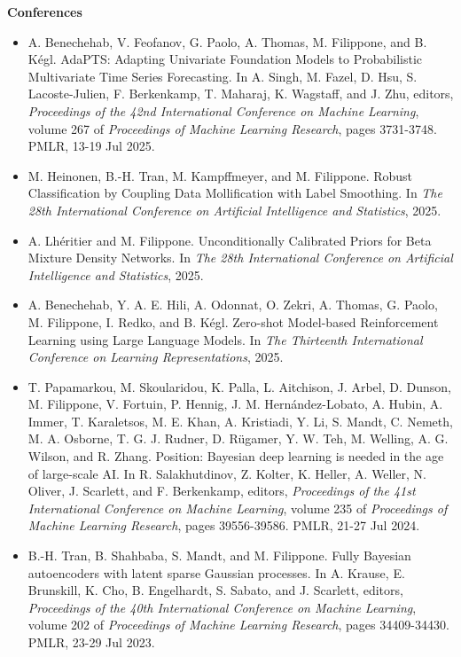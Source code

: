 \begin{itemize}
\end{itemize}\textbf{Conferences}\begin{itemize}\item  A. Benechehab, V. Feofanov, G. Paolo, A. Thomas, M. Filippone, and B. K\'egl. AdaPTS: Adapting Univariate Foundation Models to Probabilistic Multivariate Time Series Forecasting. In A. Singh, M. Fazel, D. Hsu, S. Lacoste-Julien, F. Berkenkamp, T. Maharaj, K. Wagstaff, and J. Zhu, editors, \emph{Proceedings of the 42nd International Conference on Machine Learning}, volume 267 of \emph{Proceedings of Machine Learning Research}, pages 3731-3748. PMLR, 13-19 Jul 2025.  
\item  M. Heinonen, B.-H. Tran, M. Kampffmeyer, and M. Filippone. Robust Classification by Coupling Data Mollification with Label Smoothing. In \emph{The 28th International Conference on Artificial Intelligence and Statistics}, 2025.  
\item  A. Lh\'eritier and M. Filippone. Unconditionally Calibrated Priors for Beta Mixture Density Networks. In \emph{The 28th International Conference on Artificial Intelligence and Statistics}, 2025.  
\item  A. Benechehab, Y. A. E. Hili, A. Odonnat, O. Zekri, A. Thomas, G. Paolo, M. Filippone, I. Redko, and B. K\'egl. Zero-shot Model-based Reinforcement Learning using Large Language Models. In \emph{The Thirteenth International Conference on Learning Representations}, 2025.  
\item  T. Papamarkou, M. Skoularidou, K. Palla, L. Aitchison, J. Arbel, D. Dunson, M. Filippone, V. Fortuin, P. Hennig, J. M. Hern\'andez-Lobato, A. Hubin, A. Immer, T. Karaletsos, M. E. Khan, A. Kristiadi, Y. Li, S. Mandt, C. Nemeth, M. A. Osborne, T. G. J. Rudner, D. R\"ugamer, Y. W. Teh, M. Welling, A. G. Wilson, and R. Zhang. Position: Bayesian deep learning is needed in the age of large-scale AI. In R. Salakhutdinov, Z. Kolter, K. Heller, A. Weller, N. Oliver, J. Scarlett, and F. Berkenkamp, editors, \emph{Proceedings of the 41st International Conference on Machine Learning}, volume 235 of \emph{Proceedings of Machine Learning Research}, pages 39556-39586. PMLR, 21-27 Jul 2024.  
\item  B.-H. Tran, B. Shahbaba, S. Mandt, and M. Filippone. Fully Bayesian autoencoders with latent sparse Gaussian processes. In A. Krause, E. Brunskill, K. Cho, B. Engelhardt, S. Sabato, and J. Scarlett, editors, \emph{Proceedings of the 40th International Conference on Machine Learning}, volume 202 of \emph{Proceedings of Machine Learning Research}, pages 34409-34430. PMLR, 23-29 Jul 2023.  

\end{itemize}
